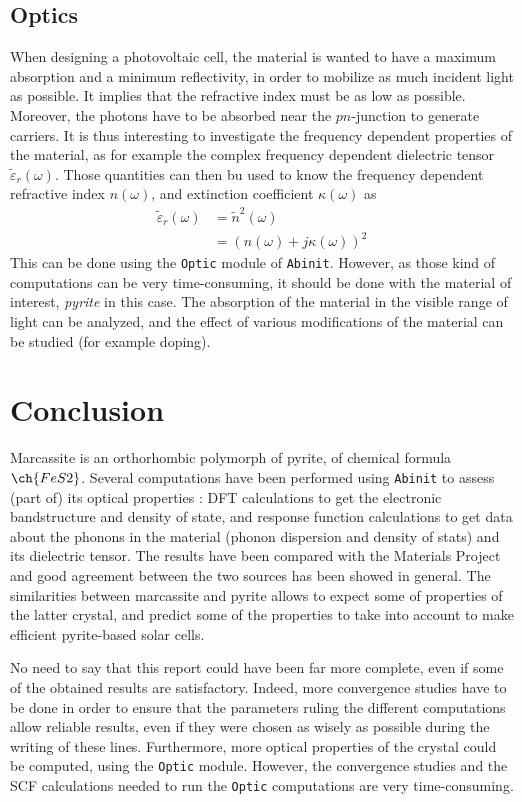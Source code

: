 \documentclass[11pt,a4paper]{article}
\begin{document}
\subsection{Optics}
When designing a photovoltaic cell, the material is wanted to have a maximum absorption and a minimum reflectivity, in order to mobilize as much incident light as possible. It implies that the refractive index must be as low as possible. Moreover, the photons have to be absorbed near the $pn$-junction to generate carriers. It is thus interesting to investigate the frequency dependent properties of the material, as for example the complex frequency dependent dielectric tensor $\tilde{\varepsilon}_r(\omega)$. Those quantities can then bu used to know the frequency dependent refractive index $n(\omega)$, and extinction coefficient $\kappa(\omega)$ as 
\begin{align}
\tilde{\varepsilon}_r(\omega) &= \tilde{n}^2(\omega)\\
&= (n(\omega)+j\kappa(\omega))^2
\end{align}
This can be done using the \texttt{Optic} module of \texttt{Abinit}. However, as those kind of computations can be very time-consuming, it should be done with the material of interest, \textit{pyrite} in this case. The absorption of the material in the visible range of light can be analyzed, and the effect of various modifications of the material can be studied (for example doping). 
\section{Conclusion}
Marcassite is an orthorhombic polymorph of pyrite, of chemical formula $\ch{FeS2}$. Several computations have been performed using \texttt{Abinit} to assess (part of) its optical properties : DFT calculations to get the electronic bandstructure and density of state, and response function calculations to get data about the phonons in the material (phonon dispersion and density of stats) and its dielectric tensor. The results have been compared with the Materials Project and good agreement between the two sources has been showed in general. The similarities between marcassite and pyrite allows to expect some of properties of the latter crystal, and predict some of the properties to take into account to make efficient pyrite-based solar cells.

No need to say that this report could have been far more complete, even if some of the obtained results are satisfactory. Indeed, more convergence studies have to be done in order to ensure that the parameters ruling the different computations allow reliable results, even if they were chosen as wisely as possible during the writing of these lines. Furthermore, more optical properties of the crystal could be computed, using the \texttt{Optic} module. However, the convergence studies and the SCF calculations needed to run the \texttt{Optic} computations are very time-consuming. 
\end{document}
